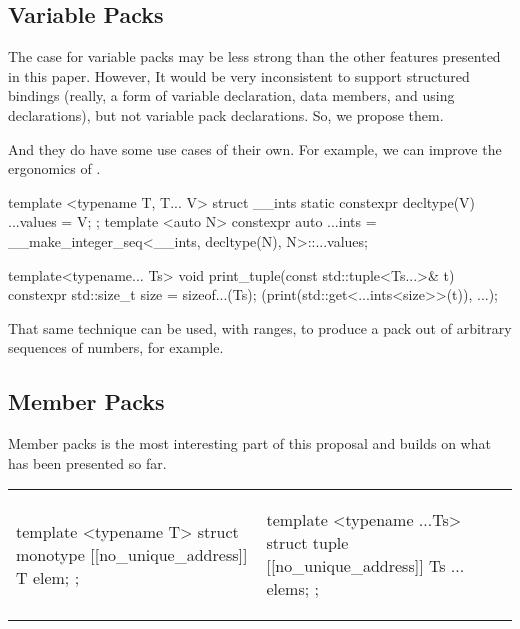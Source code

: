 \documentclass{wg21}
\begin{document}
\subsection{Variable Packs}

The case for variable packs may be less strong than the other features presented in this paper.
However, It would be very inconsistent to support structured bindings (really, a form of variable declaration, data members, and using declarations),
but not variable pack declarations.
So, we propose them.

And they do have some use cases of their own.
For example, we can improve the ergonomics of .

\begin{colorblock}
template <typename T, T... V>
struct __ints {
    static constexpr decltype(V) ...values = V;
};
template <auto N>
constexpr auto ...ints = __make_integer_seq<__ints, decltype(N), N>::...values;


template<typename... Ts>
void print_tuple(const std::tuple<Ts...>& t) {
    constexpr std::size_t size = sizeof...(Ts);
    (print(std::get<...ints<size>>(t)), ...);
}

\end{colorblock}

That same technique can be used, with ranges, to produce a pack out of arbitrary sequences
of numbers, for example.

\subsection{Member Packs}

Member packs is the most interesting part of this proposal and builds on what has been presented so far.

\begin{center}
\begin{tabular}{l|l}
\begin{minipage}[t]{0.5\textwidth}
\begin{colorblock}
template <typename T>
struct monotype {
    [[no_unique_address]] T elem;
};
\end{colorblock}
\end{minipage}
&
\begin{minipage}[t]{0.5\textwidth}
\begin{colorblock}
template <typename ...Ts>
struct tuple{
    [[no_unique_address]] Ts ... elems;
};
\end{colorblock}
\end{minipage}
\\
\end{tabular}
\end{center}
\end{document}
